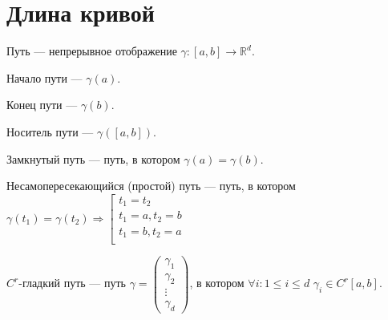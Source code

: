 \section {Длина кривой}
    \begin{Def}
   
        Путь --- непрерывное отображение $\gamma \colon [a,b] \rightarrow \mathbb{R}^d$.
    
    \end{Def}   
    
    \begin{Def}
    
        Начало пути --- $\gamma(a)$.
    
    \end{Def}   
    
    \begin{Def}

        Конец пути --- $\gamma(b)$.

    \end{Def}   
        
    \begin{Def}

        Носитель пути --- $\gamma([a,b])$.
    
    \end{Def}   

    \begin{Def}
  
        Замкнутый путь --- путь, в котором $\gamma(a) = \gamma(b)$.
    
    \end{Def}   

    \begin{Def}
 
        Несамопересекающийся (простой) путь --- путь, в котором
        $\gamma(t_1) = \gamma(t_2) \Rightarrow
        \left[ 
            \begin{gathered} 
                t_1 = t_2 \\
                t_1 = a, t_2 = b \\
                t_1 = b, t_2 = a \\
            \end{gathered} 
        \right.$
    
    \end{Def}   

    \begin{Def}
  
        $C^r$-гладкий путь --- путь 
        $\gamma = 
        \begin{pmatrix}
            \gamma_1 \\
            \gamma_2 \\
            \vdots \\
            \gamma_d
        \end{pmatrix}$, в котором $\forall i \colon 1 \le i \le d$ $\gamma_i \in C^r[a, b]$.
    
    \end{Def}

